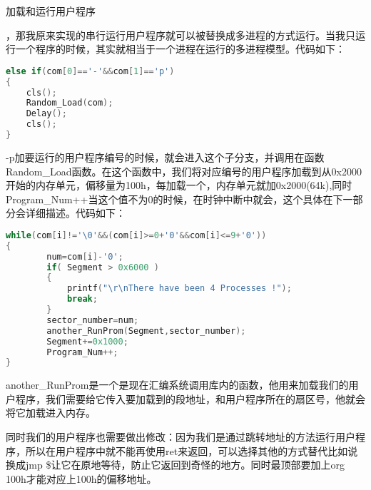 \documentclass[UTF8]{article}
\newcommand{\bg}{\colorbox{gray!13}}%
\newcommand{\red}{\color{red}}
\begin{document}
\begin{enumerate}[1)]
{\bfseries\item 加载和运行用户程序}
，那我原来实现的串行运行用户程序就可以被替换成多进程的方式运行。当我只运行一个程序的时候，其实就相当于一个进程在运行的多进程模型。代码如下：

\begin{lstlisting}[language={C}]
else if(com[0]=='-'&&com[1]=='p')
{
    cls();
    Random_Load(com);
    Delay();
    cls();
}
\end{lstlisting}
-p加要运行的用户程序编号的时候，就会进入这个子分支，并调用在函数{\bg {Random\_Load}}函数。在这个函数中，我们将对应编号的用户程序加载到从0x2000开始的内存单元，偏移量为100h，每加载一个，内存单元就加0x2000(64k),同时\bg{Program\_Num++}当这个值不为0的时候，在时钟中断中就会{\red{从内核模式跳转进入用户程序模式}}，这个具体在下一部分会详细描述。代码如下：
\begin{lstlisting}[language={C}]
while(com[i]!='\0'&&(com[i]>=0+'0'&&com[i]<=9+'0'))
{
        num=com[i]-'0';
        if( Segment > 0x6000 )
        {
            printf("\r\nThere have been 4 Processes !");
            break;
        }
        sector_number=num;
        another_RunProm(Segment,sector_number); 
        Segment+=0x1000;
        Program_Num++;
}
\end{lstlisting}
\par another\_RunProm是一个是现在汇编系统调用库内的函数，他用来加载我们的用户程序，我们需要给它传入要加载到的段地址，和用户程序所在的扇区号，他就会将它加载进入内存。
\par 同时我们的用户程序也需要做出修改：因为我们是通过跳转地址的方法运行用户程序，所以在用户程序中就不能再使用\bg{ret}来返回，可以选择其他的方式替代比如说换成\bg{jmp \$}让它在原地等待，防止它返回到奇怪的地方。同时最顶部要加上org 100h才能对应上100h的偏移地址。


\end{enumerate}
\end{document}
